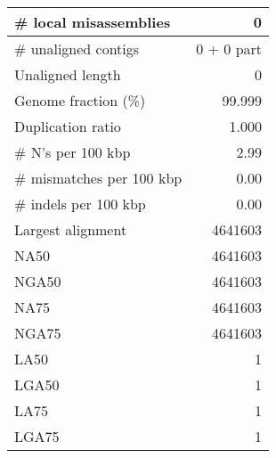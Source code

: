 \documentclass[12pt,a4paper]{article}
\begin{document}
\begin{table}[ht]
\begin{center}
\begin{tabular}{|l*{1}{|r}|}
\# local misassemblies & 0 \\ \hline
\# unaligned contigs & 0 + 0 part \\ \hline
Unaligned length & 0 \\ \hline
Genome fraction (\%) & 99.999 \\ \hline
Duplication ratio & 1.000 \\ \hline
\# N's per 100 kbp & 2.99 \\ \hline
\# mismatches per 100 kbp & 0.00 \\ \hline
\# indels per 100 kbp & 0.00 \\ \hline
Largest alignment & 4641603 \\ \hline
NA50 & 4641603 \\ \hline
NGA50 & 4641603 \\ \hline
NA75 & 4641603 \\ \hline
NGA75 & 4641603 \\ \hline
LA50 & 1 \\ \hline
LGA50 & 1 \\ \hline
LA75 & 1 \\ \hline
LGA75 & 1 \\ \hline
\end{tabular}
\end{center}
\end{table}
\end{document}
